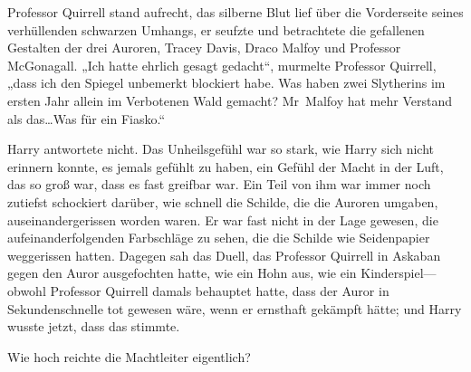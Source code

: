 Professor Quirrell stand aufrecht, das silberne Blut lief über die Vorderseite seines verhüllenden schwarzen Umhangs, er seufzte und betrachtete die gefallenen Gestalten der drei Auroren, Tracey Davis, Draco Malfoy und Professor McGonagall.
„Ich hatte ehrlich gesagt gedacht“, murmelte Professor Quirrell, „dass ich den Spiegel unbemerkt blockiert habe. Was haben zwei Slytherins im ersten Jahr allein im Verbotenen Wald gemacht? Mr~Malfoy hat mehr Verstand als das…Was für ein Fiasko.“

Harry antwortete nicht. Das Unheilsgefühl war so stark, wie Harry sich nicht erinnern konnte, es jemals gefühlt zu haben, ein Gefühl der Macht in der Luft, das so groß war, dass es fast greifbar war. Ein Teil von ihm war immer noch zutiefst schockiert darüber, wie schnell die Schilde, die die Auroren umgaben, auseinandergerissen worden waren. Er war fast nicht in der Lage gewesen, die aufeinanderfolgenden Farbschläge zu sehen, die die Schilde wie Seidenpapier weggerissen hatten. Dagegen sah das Duell, das Professor Quirrell in Askaban gegen den Auror ausgefochten hatte, wie ein Hohn aus, wie ein Kinderspiel—obwohl Professor Quirrell damals behauptet hatte, dass der Auror in Sekundenschnelle tot gewesen wäre, wenn er ernsthaft gekämpft hätte; und Harry wusste jetzt, dass das stimmte.

Wie hoch reichte die Machtleiter eigentlich?

